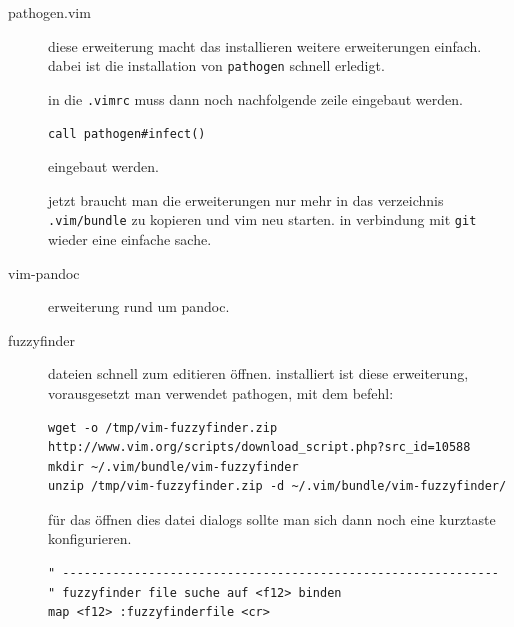 \begin{description}
\item[pathogen.vim]
diese erweiterung macht das installieren weitere erweiterungen einfach.
dabei ist die installation von \texttt{pathogen} schnell erledigt.


in die \texttt{.vimrc} muss dann noch nachfolgende zeile eingebaut
werden.

\begin{verbatim}
call pathogen#infect()
\end{verbatim}

eingebaut werden.

jetzt braucht man die erweiterungen nur mehr in das verzeichnis
\texttt{.vim/bundle} zu kopieren und vim neu starten. in verbindung mit
\texttt{git} wieder eine einfache sache.


\item[vim-pandoc]
erweiterung rund um pandoc.
\item[fuzzyfinder]
dateien schnell zum editieren öffnen. installiert ist diese erweiterung,
vorausgesetzt man verwendet pathogen, mit dem befehl:

\begin{verbatim}
wget -o /tmp/vim-fuzzyfinder.zip http://www.vim.org/scripts/download_script.php?src_id=10588
mkdir ~/.vim/bundle/vim-fuzzyfinder
unzip /tmp/vim-fuzzyfinder.zip -d ~/.vim/bundle/vim-fuzzyfinder/
\end{verbatim}

für das öffnen dies datei dialogs sollte man sich dann noch eine
kurztaste konfigurieren.

\begin{verbatim}
" -------------------------------------------------------------
" fuzzyfinder file suche auf <f12> binden
map <f12> :fuzzyfinderfile <cr>
\end{verbatim}
\end{description}

